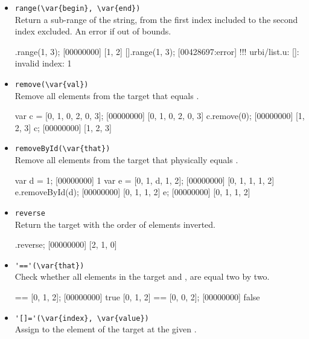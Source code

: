 \begin{itemize}
\item \lstinline|range(\var{begin}, \var{end})|\\
Return a sub-range of the string, from the first index included to the
second index excluded. An error if out of bounds.

\begin{urbiscript}[firstnumber=last]
[0, 1, 2, 3].range(1, 3);
[00000000] [1, 2]
[].range(1, 3);
[00428697:error] !!! urbi/list.u: []: invalid index: 1
\end{urbiscript}


\item \lstinline|remove(\var{val})|\\
Remove all elements from the target that equals .

\begin{urbiscript}[firstnumber=last]
var c = [0, 1, 0, 2, 0, 3];
[00000000] [0, 1, 0, 2, 0, 3]
c.remove(0);
[00000000] [1, 2, 3]
c;
[00000000] [1, 2, 3]
\end{urbiscript}

\item \lstinline|removeById(\var{that})|\\
Remove all elements from the target that physically equals .

\begin{urbiscript}[firstnumber=last]
var d = 1;
[00000000] 1
var e = [0, 1, d, 1, 2];
[00000000] [0, 1, 1, 1, 2]
e.removeById(d);
[00000000] [0, 1, 1, 2]
e;
[00000000] [0, 1, 1, 2]
\end{urbiscript}

\item \lstinline|reverse|\\
Return the target with the order of elements inverted.

\begin{urbiscript}[firstnumber=last]
[0, 1, 2].reverse;
[00000000] [2, 1, 0]
\end{urbiscript}

\item \lstinline|'=='(\var{that})|\\
Check whether all elements in the target and , are
equal two by two.

\begin{urbiscript}[firstnumber=last]
[0, 1, 2] == [0, 1, 2];
[00000000] true
[0, 1, 2] == [0, 0, 2];
[00000000] false
\end{urbiscript}

\item \lstinline|'[]='(\var{index}, \var{value})|\\
\label{sec:std-list-setnth}
Assign  to the element of the target at the given .


\end{itemize}
